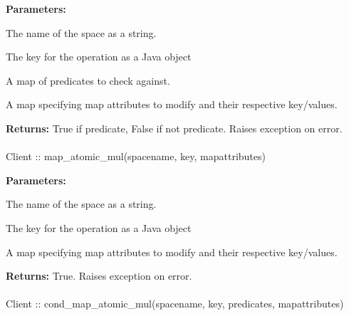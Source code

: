 \noindent\textbf{Parameters:}
\begin{description}[labelindent=\widthof{{\code{mapattributes}}},leftmargin=*,noitemsep,nolistsep,align=right]
\item[\code{spacename}] The name of the space as a string.
\item[\code{key}] The key for the operation as a Java object
\item[\code{predicates}] A map of predicates to check against.
\item[\code{mapattributes}] A map specifying map attributes to modify and their respective key/values.
\end{description}

\noindent\textbf{Returns:}
True if predicate, False if not predicate.  Raises exception on error.

\paragraph{}
\label{api:java:map_atomic_mul}
\begin{javacode}
Client :: map_atomic_mul(spacename, key, mapattributes)
\end{javacode}
\funcdesc 

\noindent\textbf{Parameters:}
\begin{description}[labelindent=\widthof{{\code{mapattributes}}},leftmargin=*,noitemsep,nolistsep,align=right]
\item[\code{spacename}] The name of the space as a string.
\item[\code{key}] The key for the operation as a Java object
\item[\code{mapattributes}] A map specifying map attributes to modify and their respective key/values.
\end{description}

\noindent\textbf{Returns:}
True.  Raises exception on error.

\paragraph{}
\label{api:java:cond_map_atomic_mul}
\begin{javacode}
Client :: cond_map_atomic_mul(spacename, key, predicates, mapattributes)
\end{javacode}
\funcdesc 

